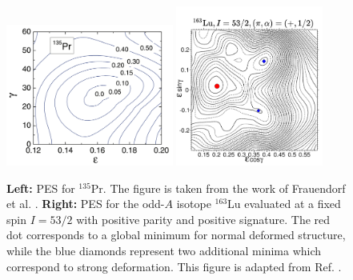 \begin{figure}
    \centering
    \includegraphics[width=0.49\textwidth]{Chapters/Figures/135Pr-PES.pdf}
    \includegraphics[width=0.43\textwidth]{Chapters/Figures/163Lu-PES.pdf}
    \caption{\textbf{Left:} PES for $^{135}$Pr. The figure is taken from the work of Frauendorf et al. \cite{frauendorf2014transverse}. \textbf{Right:} PES for the odd-$A$ isotope $^{163}$Lu evaluated at a fixed spin $I=53/2$ with positive parity and positive signature. The red dot corresponds to a global minimum for normal deformed structure, while the blue diamonds represent two additional minima which correspond to strong deformation. This figure is adapted from Ref. \cite{jensen2002wobbling}.}
    \label{pes-example-set-2}
\end{figure}

